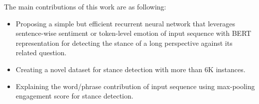 \documentclass[11pt,a4paper]{article}
\begin{document}
The main contributions of this work are as following:
\begin{itemize}
    \item Proposing a simple but efficient recurrent neural network that leverages sentence-wise sentiment or token-level emotion of input sequence with BERT representation for detecting the stance of a long perspective against its related question.
    \item Creating a novel dataset for stance detection with more than $6$K instances.
    \item Explaining the word/phrase contribution of input sequence using max-pooling engagement score for stance detection.
\end{itemize}
\end{document}
